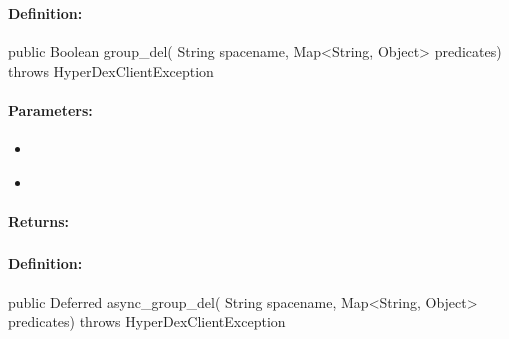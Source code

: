 \pagebreak
\subsubsection{}
\label{api:java:group_del}


\paragraph{Definition:}
\begin{javacode}
public Boolean group_del(
        String spacename,
        Map<String, Object> predicates) throws HyperDexClientException
\end{javacode}

\paragraph{Parameters:}
\begin{itemize}[noitemsep]
\item {}\\

\item {}\\

\end{itemize}

\paragraph{Returns:}


\pagebreak
\subsubsection{}
\label{api:java:async_group_del}


\paragraph{Definition:}
\begin{javacode}
public Deferred async_group_del(
        String spacename,
        Map<String, Object> predicates) throws HyperDexClientException
\end{javacode}

